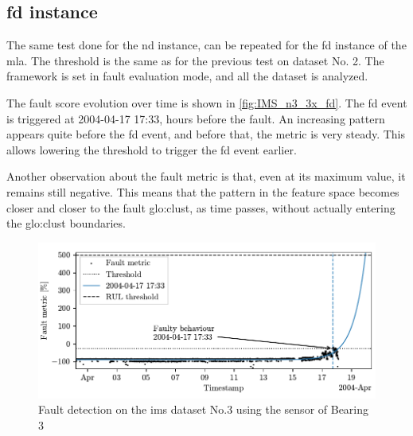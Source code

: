 \subsection{\gls{fd} instance}

The same test done for the \gls{nd} instance, can be repeated for the \gls{fd} instance of the \gls{mla}. The threshold is the same as for the previous test on dataset No. 2. The framework is set in fault evaluation mode, and all the dataset is analyzed. 

The fault score evolution over time is shown in \autoref{fig:IMS_n3_3x_fd}. 
The \gls{fd} event is triggered at 2004-04-17 17:33, hours before the fault.
An increasing pattern appears quite before the \gls{fd} event, and before that, the metric is very steady. This allows lowering the threshold to trigger the \gls{fd} event earlier.

Another observation about the fault metric is that, even at its maximum value, it remains still negative. This means that the pattern in the feature space becomes closer and closer to the fault \gls{glo:clust}, as time passes, without actually entering the \gls{glo:clust} boundaries.

\begin{figure}
    \centering
    \includegraphics{images/IMS/Test03/FD.pdf}
    \caption{Fault detection on the \gls{ims} dataset No.3 using the sensor of Bearing 3}
    \label{fig:IMS_n3_3x_fd}
\end{figure}